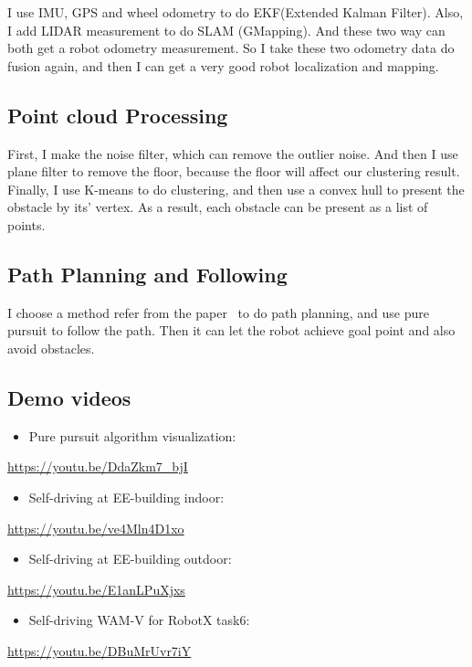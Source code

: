 \documentclass[letterpaper, 10 pt, conference]{ieeeconf}  %
\newcommand\tab[1][1cm]{\hspace*{#1}}
\begin{document}
I use IMU, GPS and wheel odometry to do EKF(Extended Kalman Filter). Also, I add LIDAR measurement to do SLAM (GMapping). And these two way can both get a robot odometry measurement. So I take these two odometry data do fusion again, and then I can get a very good robot localization and mapping.

\subsection{Point cloud Processing}

First, I make the noise filter, which can remove the outlier noise. And then I use plane filter to remove the floor, because the floor will affect our clustering result. Finally, I use K-means to do clustering, and then use a convex hull to present the obstacle by its' vertex. As a result, each obstacle can be present as a list of points.

\subsection{Path Planning and Following}

I choose a method refer from the paper~\cite{1527001} to do path planning, and use pure pursuit to follow the path. Then it can let the robot achieve goal point and also avoid obstacles.

\subsection{Demo videos} 
\begin{itemize}
\item Pure pursuit algorithm visualization: 
\end{itemize}
\tab\url{https://youtu.be/DdaZkm7_bjI}
\begin{itemize}
\item Self-driving at EE-building indoor: 
\end{itemize}
\tab\url{https://youtu.be/ve4Mln4D1xo}
\begin{itemize}
\item Self-driving at EE-building outdoor: 
\end{itemize}
\tab\url{https://youtu.be/E1anLPuXjxs}
\begin{itemize}
\item Self-driving WAM-V for RobotX task6: 
\end{itemize}
\tab\url{https://youtu.be/DBuMrUvr7iY}

\addtolength{\textheight}{-12cm}   %



\end{document}
